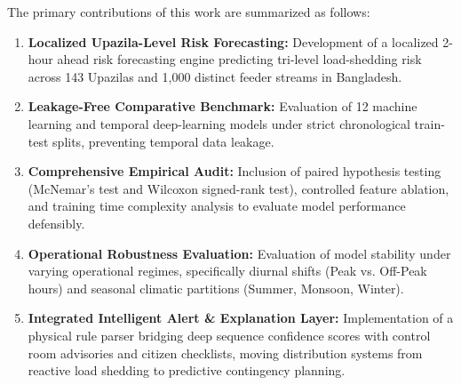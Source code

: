 The primary contributions of this work are summarized as follows:
\begin{enumerate}
    \item \textbf{Localized Upazila-Level Risk Forecasting:} Development of a localized 2-hour ahead risk forecasting engine predicting tri-level load-shedding risk across 143 Upazilas and 1,000 distinct feeder streams in Bangladesh.
    \item \textbf{Leakage-Free Comparative Benchmark:} Evaluation of 12 machine learning and temporal deep-learning models under strict chronological train-test splits, preventing temporal data leakage.
    \item \textbf{Comprehensive Empirical Audit:} Inclusion of paired hypothesis testing (McNemar's test and Wilcoxon signed-rank test), controlled feature ablation, and training time complexity analysis to evaluate model performance defensibly.
    \item \textbf{Operational Robustness Evaluation:} Evaluation of model stability under varying operational regimes, specifically diurnal shifts (Peak vs. Off-Peak hours) and seasonal climatic partitions (Summer, Monsoon, Winter).
    \item \textbf{Integrated Intelligent Alert \& Explanation Layer:} Implementation of a physical rule parser bridging deep sequence confidence scores with control room advisories and citizen checklists, moving distribution systems from reactive load shedding to predictive contingency planning.
\end{enumerate}
